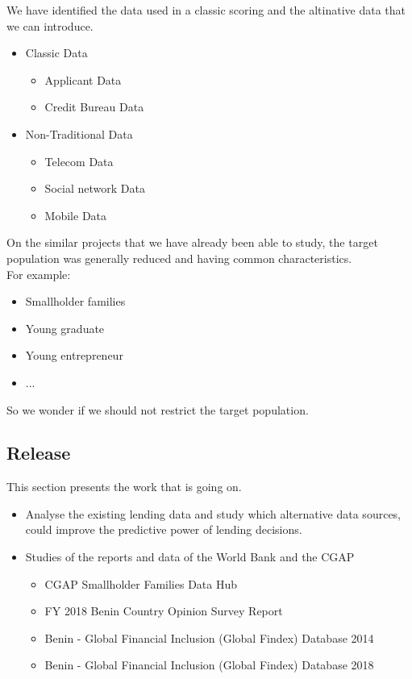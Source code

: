 \documentclass[12pt,a4paper]{amsart}
\numberwithin{equation}{section}
\theoremstyle{plain}
\theoremstyle{definition}
\begin{document}
We have identified the data used in a classic scoring and the altinative data that we can introduce.
\begin{itemize}
   \item Classic Data
   \begin{itemize}
     \item Applicant Data
     \item Credit Bureau Data
   \end{itemize}
   \item Non-Traditional Data
   \begin{itemize}
     \item Telecom Data
     \item Social network Data
     \item Mobile Data     
   \end{itemize}
\end{itemize}

On the similar projects that we have already been able to study, the target population was generally reduced and having common characteristics.\\
For example:
\begin{itemize}
 \item Smallholder families
 \item Young graduate
 \item Young entrepreneur
 \item ...
\end{itemize}
So we wonder if we should not restrict the target population.

\subsection{Release}
This section presents the work that is going on.\\
\begin{itemize}
 \item Analyse the existing lending data and study which alternative data sources,
could improve the predictive power of lending decisions.
 \item Studies of the reports and data of the World Bank and the CGAP
\begin{itemize}
 \item CGAP Smallholder Families Data Hub
 \item FY 2018 Benin Country Opinion Survey Report
 \item Benin - Global Financial Inclusion (Global Findex) Database 2014
 \item Benin - Global Financial Inclusion (Global Findex) Database 2018
\end{itemize}

\end{itemize}
\end{document}
